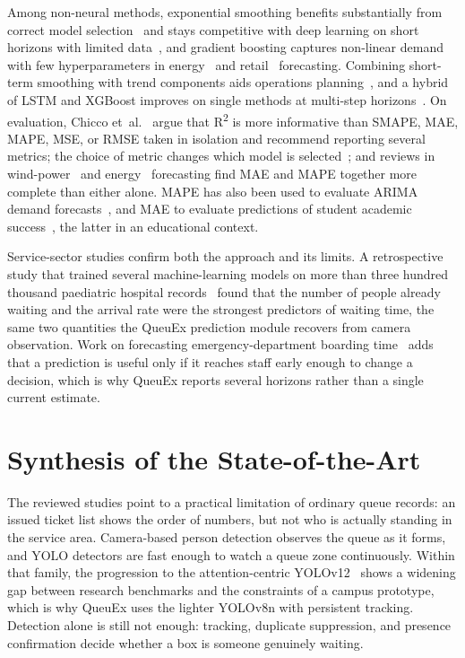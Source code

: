 \documentclass{research}
\newcommand{\sysname}{QueuEx}
\begin{document}
Among non-neural methods, exponential smoothing benefits substantially
from correct model selection~\cite{rrlcomp010exponentialsmoothingmodel}
and stays competitive with deep learning on short horizons with limited
data~\cite{rrlcomp011reviewmethodsmodels}, and gradient boosting captures
non-linear demand with few hyperparameters in
energy~\cite{rrlcomp035energyconsumptionforecasts} and
retail~\cite{rrlcomp044disaggregatedretailforecasting} forecasting.
Combining short-term smoothing with trend components aids operations
planning~\cite{rrlcomp070predictivesalesoperations}, and a hybrid of
LSTM and XGBoost improves on single methods at multi-step
horizons~\cite{rrlcomp071predictiveanalyticssales}. On evaluation,
Chicco et~al.~\cite{rrlcomp093coefficientdeterminationsquared} argue
that R\textsuperscript{2} is more informative than SMAPE, MAE, MAPE,
MSE, or RMSE taken in isolation and recommend reporting several metrics;
the choice of metric changes which model is
selected~\cite{rrlcomp094comparativeevaluationmodel}; and reviews in
wind-power~\cite{rrlcomp095evaluationmetricswind} and
energy~\cite{rrlcomp096performanceevaluationmachine} forecasting find
MAE and MAPE together more complete than either alone. MAPE has also
been used to evaluate ARIMA demand
forecasts~\cite{rrlcomp087predictiveanalyticsdemand}, and MAE to
evaluate predictions of student academic
success~\cite{rrlcomp100comparativeanalysismachine}, the latter in an
educational context.

Service-sector studies confirm both the approach and its limits. A
retrospective study that trained several machine-learning models on more
than three hundred thousand paediatric hospital
records~\cite{pediatricwait2025} found that the number of people
already waiting and the arrival rate were the strongest predictors of
waiting time, the same two quantities the \sysname{} prediction module
recovers from camera observation. Work on forecasting
emergency-department boarding time~\cite{boardingforecast2026} adds that
a prediction is useful only if it reaches staff early enough to change a
decision, which is why \sysname{} reports several horizons rather than a
single current estimate.

\section{Synthesis of the State-of-the-Art}
\label{cr:synthesis}

The reviewed studies point to a practical limitation of ordinary queue
records: an issued ticket list shows the order of numbers, but not who is
actually standing in the service area. Camera-based person detection
observes the queue as it forms, and YOLO detectors are fast enough to
watch a queue zone continuously. Within that family, the progression to
the attention-centric YOLOv12~\cite{tian2025yolov12} shows a widening gap
between research benchmarks and the constraints of a campus prototype,
which is why \sysname{} uses the lighter YOLOv8n with persistent
tracking. Detection alone is still not enough: tracking, duplicate
suppression, and presence confirmation decide whether a box is someone
genuinely waiting.
\end{document}
